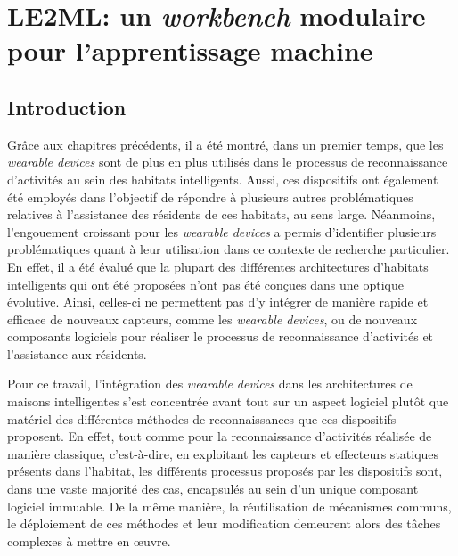 \chapter{LE2ML: un \textit{workbench} modulaire pour l'apprentissage machine}
\label{chap:6}

\section{Introduction}

Grâce aux chapitres précédents, il a été montré, dans un premier temps, que les \textit{wearable devices} sont de plus en plus utilisés dans le processus de reconnaissance d'activités au sein des habitats intelligents. Aussi, ces dispositifs ont également été employés dans l'objectif de répondre à plusieurs autres problématiques relatives à l'assistance des résidents de ces habitats, au sens large. Néanmoins, l'engouement croissant pour les \textit{wearable devices} a permis d'identifier plusieurs problématiques quant à leur utilisation dans ce contexte de recherche particulier. En effet, il a été évalué que la plupart des différentes architectures d'habitats intelligents qui ont été proposées n'ont pas été conçues dans une optique évolutive. Ainsi, celles-ci ne permettent pas d'y intégrer de manière rapide et efficace de nouveaux capteurs, comme les \textit{wearable devices}, ou de nouveaux composants logiciels pour réaliser le processus de reconnaissance d'activités et l'assistance aux résidents.

Pour ce travail, l'intégration des \textit{wearable devices} dans les architectures de maisons intelligentes s'est concentrée avant tout sur un aspect logiciel plutôt que matériel des différentes méthodes de reconnaissances que ces dispositifs proposent. En effet, tout comme pour la reconnaissance d'activités réalisée de manière classique, c'est-à-dire, en exploitant les capteurs et effecteurs statiques présents dans l'habitat, les différents processus proposés par les dispositifs sont, dans une vaste majorité des cas, encapsulés au sein d'un unique composant logiciel immuable. De la même manière, la réutilisation de mécanismes communs, le déploiement de ces méthodes et leur modification demeurent alors des tâches complexes à mettre en \oe{}uvre.

